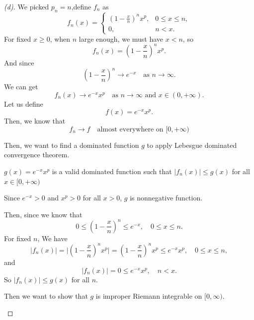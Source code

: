\begin{proof}[(d)]
    We picked $p_n = n $,define $f_n$ as
    \[
        f_n(x)=
        \begin{cases}
        (1- \frac{x}{n})^n x^p, & 0 \le x \le n,\\
        0, & n < x.
        \end{cases}
    \]
    For fixed $x \ge 0$, when $n$ large enough, we must have $x < n$, so
    \[
        f_n(x) = (1- \frac{x}{n})^n x^p.
    \]
    And since
    \[
        (1- \frac{x}{n})^n \to e^{-x} \quad \text{as $n \to \infty$}.
    \]
    We can get 
    \[
        f_n(x) \to e^{-x}x^p \quad \text{as $n \to \infty$ and $x\in (0, +\infty)$}.
    \]
    Let us define 
    \[
        f(x) = e^{-x}x^p.
    \]
    Then, we know that 
    \[
        f_n \to f \quad\text{almost everywhere on $[0, +\infty)$}
    \]

    Then, we want to find a dominated function $g$ to apply Lebesgue dominated convergence theorem.
    \begin{claim}
        $g(x) = e^{-x} x^p$ is a valid dominated function such that $\vert f_n(x)\vert \le g(x)$ for all $x \in [0, +\infty)$
    \end{claim}
    \begin{explanation}
        Since $e^{-x} > 0$ and $x^p > 0$ for all $x > 0$, $g$ is nonnegative function.

        Then, since we know that 
        \[
            0 \le (1-\frac{x}{n})^n \le e^{-x}, \quad 0 \le x \le n.
        \]
        For fixed $n$,
        We have
        \[
            \lvert f_n(x) \rvert = \lvert (1-\frac{x}{n})^nx^p \rvert = (1-\frac{x}{n})^nx^p \le e^{-x}x^p, \quad 0 \le x \le n,
        \]
        and 
        \[
            \lvert f_n(x) \rvert = 0 \le e^{-x} x^p, \quad n < x.
        \]
        So $\lvert f_n(x) \rvert \le g(x)$ for all $n$.

        Then we want to show that $g$ is improper Riemann integrable on $[0, \infty)$.


\end{explanation}
\end{proof}
